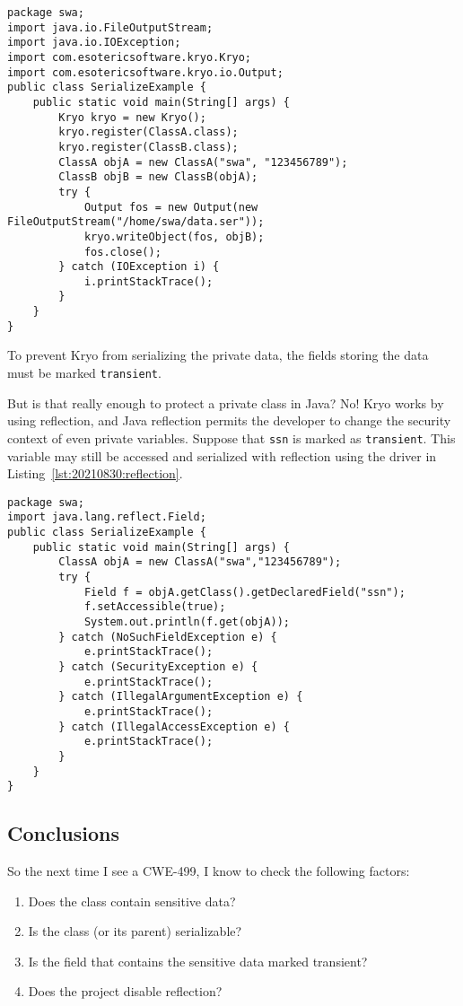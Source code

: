 \begin{lstlisting}[caption={Kryo Driver},captionpos=b,style=JavaStyle,basicstyle=\scriptsize,label={lst:20210830:kryo}]
package swa;
import java.io.FileOutputStream;
import java.io.IOException;
import com.esotericsoftware.kryo.Kryo;
import com.esotericsoftware.kryo.io.Output;
public class SerializeExample {
	public static void main(String[] args) {
		Kryo kryo = new Kryo();
		kryo.register(ClassA.class);
		kryo.register(ClassB.class);
		ClassA objA = new ClassA("swa", "123456789");
		ClassB objB = new ClassB(objA);
		try {
			Output fos = new Output(new FileOutputStream("/home/swa/data.ser"));
			kryo.writeObject(fos, objB);
			fos.close();
		} catch (IOException i) {
			i.printStackTrace();
		}
	}
}
\end{lstlisting}

To prevent Kryo from serializing the private data, the fields storing the data must be marked \texttt{transient}.

But is that really enough to protect a private class in Java? No! Kryo works by using reflection, and Java reflection permits the developer to change the security context of even private variables. Suppose that \texttt{ssn} is marked as \texttt{transient}. This variable may still be accessed and serialized with reflection using the driver in Listing~\ref{lst:20210830:reflection}.

\begin{lstlisting}[caption={Reflection Driver},captionpos=b,style=JavaStyle,basicstyle=\scriptsize,label={lst:20210830:reflection}]
package swa;
import java.lang.reflect.Field;
public class SerializeExample {
	public static void main(String[] args) {
		ClassA objA = new ClassA("swa","123456789");
		try {
			Field f = objA.getClass().getDeclaredField("ssn");
			f.setAccessible(true);
			System.out.println(f.get(objA));
		} catch (NoSuchFieldException e) {
			e.printStackTrace();
		} catch (SecurityException e) {
			e.printStackTrace();
		} catch (IllegalArgumentException e) {
			e.printStackTrace();
		} catch (IllegalAccessException e) {
			e.printStackTrace();
		}
	}
}
\end{lstlisting}

\subsection{Conclusions}
So the next time I see a CWE-499, I know to check the following factors:
\begin{enumerate}
	\item Does the class contain sensitive data?
	\item Is the class (or its parent) serializable?
	\item Is the field that contains the sensitive data marked transient?
	\item Does the project disable reflection?
\end{enumerate}

